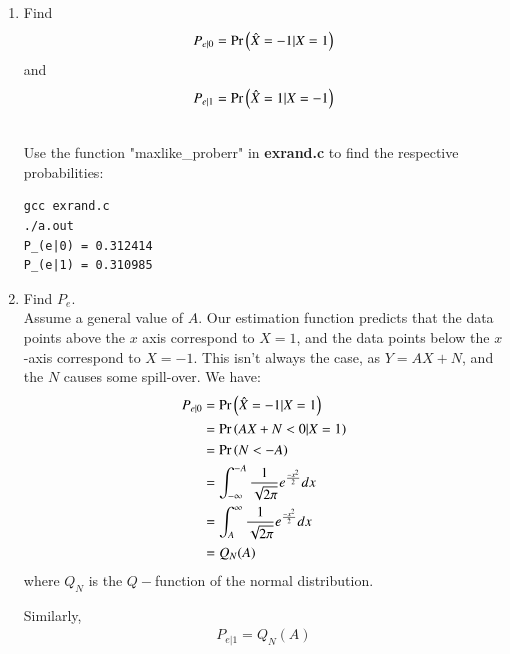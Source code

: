 \documentclass[journal,12pt,twocolumn]{IEEEtran}
\renewcommand\thesection{\arabic{section}}
\begin{document}
\begin{enumerate}[label=\thesection.\arabic*
    ,ref=\thesection.\theenumi]
\begin{align}
    \sgn(y) = 
    \begin{cases}
        -1, & y \in (-\infty,0] \\
        1, & y \in (0, \infty)
    \end{cases}
\end{align}

Using $\sgn{y}$, we can operate on $Y$ to find corresponding values of $X$.




\item
\label{ml-ch4_sim}
Find 
\begin{equation}
	P_{e|0} = \Pr\left(\hat{X} = -1|X=1\right)
\end{equation}
and 
\begin{equation}
	P_{e|1} = \Pr\left(\hat{X} = 1|X=-1\right)
\end{equation}

\\
\solution Use the function "maxlike\_proberr" in \textbf{exrand.c} to find the respective probabilities:

\begin{lstlisting}
gcc exrand.c
./a.out
P_(e|0) = 0.312414
P_(e|1) = 0.310985
\end{lstlisting}




\item Find $P_e$.
\\
\solution
Assume a general value of $A$. Our estimation function predicts that the data points above the $x$ axis
correspond to $X=1$, and the data points below the $x$-axis correspond to $X=-1$. This isn't always the case,
as $Y=AX+N$, and the $N$ causes some spill-over.
We have:
\begin{align}
    P_{e|0} &= \Pr\left(\hat{X} = -1|X=1\right) \\
    &= \Pr\left(AX+N<0|X=1\right) \\
    &= \Pr\left(N<-A\right) \\
    &= \int_{-\infty} ^{-A} \frac{1}{\sqrt{2\pi}} e^{\frac{-x^2}{2}} dx \\
    &= \int_{A} ^{\infty} \frac{1}{\sqrt{2\pi}} e^{\frac{-x^2}{2}} dx \\
    &= Q_N(A)
\end{align}
where $Q_N$ is the $Q-$function of the normal distribution.

Similarly, 
\begin{align}
    P_{e|1} = Q_N(A)
\end{align}


\end{enumerate}
\end{document}
